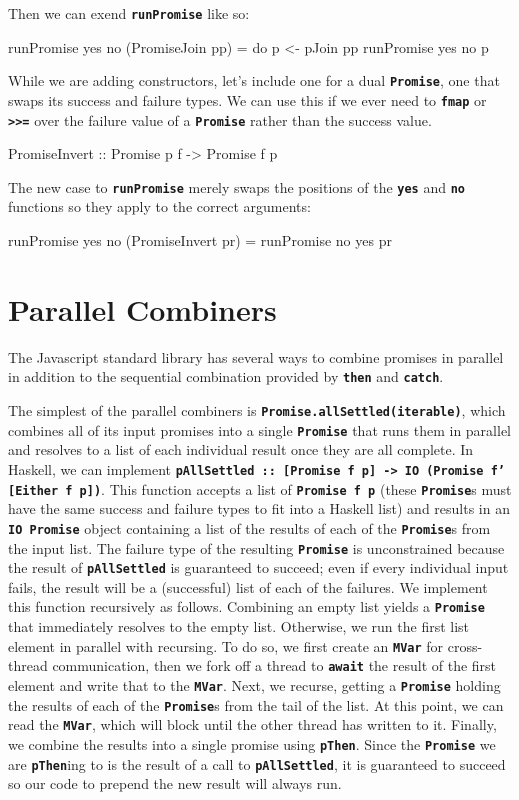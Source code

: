 \documentclass[12pt, english, letterpaper]{kuthesis}
\newcommand{\lit}[1]{\textbf{\texttt{#1}}}
\begin{document}
  Then we can exend \lit{runPromise} like so:
\begin{code}
runPromise yes no (PromiseJoin pp) = do
p <- pJoin pp
runPromise yes no p
\end{code}

  While we are adding constructors, let's include one for a dual \lit{Promise}, one that swaps its success and failure types.  We can use this if we ever need to \lit{fmap} or \lit{>>=} over the failure value of a \lit{Promise} rather than the success value.

  \begin{code}
    PromiseInvert :: Promise p f -> Promise f p
  \end{code}
  
  The new case to \lit{runPromise} merely swaps the positions of the \lit{yes} and \lit{no} functions so they apply to the correct arguments:

  \begin{code}
  runPromise yes no (PromiseInvert pr) = runPromise no yes pr
  \end{code}

\section*{Parallel Combiners}
The Javascript standard library has several ways to combine promises in parallel in addition to the sequential combination provided by \lit{then} and \lit{catch}.

The simplest of the parallel combiners is \lit{Promise.allSettled(iterable)}, which combines all of its input promises into a single \lit{Promise} that runs them in parallel and resolves to a list of each individual result once they are all complete.  In Haskell, we can implement \lit{pAllSettled ::\ [Promise f p] -> IO (Promise f' [Either f p])}.  This function accepts a list of \lit{Promise f p} (these \lit{Promise}s must have the same success and failure types to fit into a Haskell list) and results in an \lit{IO Promise} object containing a list of the results of each of the \lit{Promise}s from the input list.  The failure type of the resulting \lit{Promise} is unconstrained because the result of \lit{pAllSettled} is guaranteed to succeed; even if every individual input fails, the result will be a (successful) list of each of the failures.  We implement this function recursively as follows.  Combining an empty list yields a \lit{Promise} that immediately resolves to the empty list.  Otherwise, we run the first list element in parallel with recursing.  To do so, we first create an \lit{MVar} for cross-thread communication, then we fork off a thread to \lit{await} the result of the first element and write that to the \lit{MVar}.  Next, we recurse, getting a \lit{Promise} holding the results of each of the \lit{Promise}s from the tail of the list.  At this point, we can read the \lit{MVar}, which will block until the other thread has written to it.  Finally, we combine the results into a single promise using \lit{pThen}.  Since the \lit{Promise} we are \lit{pThen}ing to is the result of a call to \lit{pAllSettled}, it is guaranteed to succeed so our code to prepend the new result will always run.
\end{document}
